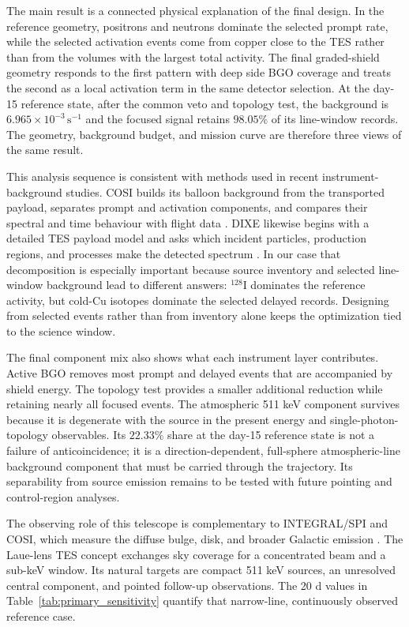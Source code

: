\documentclass[11pt]{article}
\newcommand{\cps}{\ensuremath{\,\mathrm{s^{-1}}}}
\begin{document}
The main result is a connected physical explanation of the final design. In the
reference geometry, positrons and neutrons dominate the selected prompt rate, while
the selected activation events come from copper close to the TES rather than from
the volumes with the largest total activity. The final graded-shield geometry responds to the
first pattern with deep side BGO coverage and treats the second as a local activation
term in the same detector selection. At the day-15 reference state, after the
common veto and topology test, the background is $6.965\times10^{-3}\cps$ and
the focused signal retains $98.05\%$
of its line-window records. The geometry, background budget, and mission curve are
therefore three views of the same result.

This analysis sequence is consistent with methods used in recent
instrument-background studies.
COSI builds its balloon background from the transported payload, separates prompt
and activation components, and compares their spectral and time behaviour with
flight data \cite{Gallego2025Balloon}. DIXE likewise begins with a detailed TES
payload model and asks which incident particles, production regions, and processes
make the detected spectrum \cite{Tian2026DIXE}. In our case that decomposition is
especially important because source inventory and selected line-window background
lead to different answers: $^{128}$I dominates the reference activity, but cold-Cu
isotopes dominate the selected delayed records. Designing from selected events
rather than from inventory alone keeps the optimization tied to the science window.

The final component mix also shows what each instrument layer contributes. Active
BGO removes most prompt and delayed events that are accompanied by shield energy.
The topology test provides a smaller additional reduction while retaining nearly
all focused events. The atmospheric 511 keV component survives because it is
degenerate with the source in the present energy and single-photon-topology
observables. Its $22.33\%$ share at the
day-15 reference state is not a failure of anticoincidence; it is a
direction-dependent, full-sphere atmospheric-line background component that must
be carried through the trajectory. Its separability from source emission remains
to be tested with future pointing and control-region analyses.

The observing role of this telescope is complementary to INTEGRAL/SPI and COSI,
which measure the diffuse bulge, disk, and broader Galactic emission
\cite{Siegert2016AA,Kierans2020,Siegert2020COSI,Yoneda2025,Karwin2023}.
The Laue-lens TES concept exchanges sky coverage for a concentrated beam and a
sub-keV window. Its natural targets are compact 511 keV sources, an unresolved
central component, and pointed follow-up observations. The 20 d values in
Table~\ref{tab:primary_sensitivity} quantify that narrow-line, continuously
observed reference case.
\end{document}
